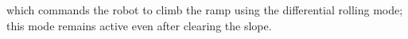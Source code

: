 %

which commands the robot to climb the ramp using the differential rolling mode; this mode remains active even after clearing the slope.
